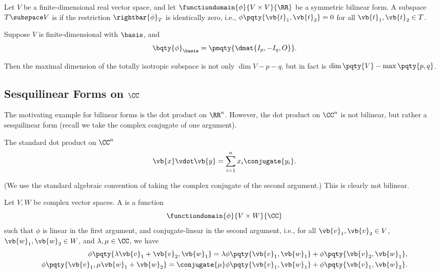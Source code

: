 \begin{definition}
    Let \(V\) be a finite-dimensional real vector space, and let \(\functiondomain{\phi}{V \times V}{\RR}\) be a symmetric bilinear form. A subspace \(T \subspace V\) is  if the restriction \(\rightbar{\phi}_T\) is identically zero, i.e., \(\phi\pqty{\vb{t}_1, \vb{t}_2} = 0\) for all \(\vb{t}_1, \vb{t}_2 \in T\).
\end{definition}

\begin{example}
    Suppose \(V\) is finite-dimensional with \(\basis\), and
    \[
        \bqty{\phi}_{\basis} = \pmqty{\dmat{I_p, -I_q, O}}.
    \]

    Then the maximal dimension of the totally isotropic subspace is not only \(\dim{V} - p - q\), but in fact is \(\dim \pqty{V} - \max\pqty{p, q}\).
\end{example}

\subsection{Sesquilinear Forms on \(\CC\)}

The motivating example for bilinear forms is the dot product on \(\RR^n\). However, the dot product on \(\CC^n\) is not bilinear, but rather a sesquilinear form (recall we take the complex conjugate of one argument).

\begin{example}
    The standard dot product on \(\CC^n\)
    \[
        \vb{x} \vdot \vb{y} = \sum_{i = 1}^{n} x_i \conjugate{y_i}.
    \]

    (We use the standard algebraic convention of taking the complex conjugate of the second argument.) This is clearly not bilinear.
\end{example}

\begin{definition}
    Let \(V, W\) be complex vector spaces. A  is a function
    \[
        \functiondomain{\phi}{V \times W}{\CC}
    \]
    such that \(\phi\) is linear in the first argument, and conjugate-linear in the second argument, i.e., for all \(\vb{v}_1, \vb{v}_2 \in V\), \(\vb{w}_1, \vb{w}_2 \in W\), and \(\lambda, \mu \in \CC\), we have
    \begin{align*}
        \phi\pqty{\lambda \vb{v}_1 + \vb{v}_2, \vb{w}_1} = \lambda \phi\pqty{\vb{v}_1, \vb{w}_1} + \phi\pqty{\vb{v}_2, \vb{w}_1}, \\
        \phi\pqty{\vb{v}_1, \mu \vb{w}_1 + \vb{w}_2} = \conjugate{\mu} \phi\pqty{\vb{v}_1, \vb{w}_1} + \phi\pqty{\vb{v}_1, \vb{w}_2}.
    \end{align*}
\end{definition}

